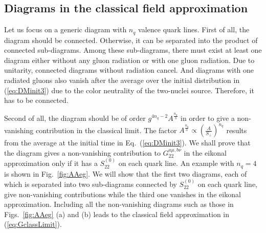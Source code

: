 \documentclass[onecolumn,showpacs,nobibnotes,nofootinbib,12pt,aps,prd,showpacs,notitlepage,nofootinbib,preprintnumbers,amsmath,amssymb]{article}
\def\eq#1{{Eq.~(\ref{#1})}}
\begin{document}

\subsection{Diagrams in the classical field approximation}

Let us focus on a generic diagram with $n_q$ valence quark
lines. First of all, the diagram should be connected. Otherwise, it
can be separated into the product of connected sub-diagrams. Among
these sub-diagrams, there must exist at least one diagram either
without any gluon radiation or with one gluon radiation. Due to
unitarity, connected diagrams without radiation cancel. And diagrams
with one radiated gluons also vanish after the average over the
initial distribution in (\ref{eq:DMinit3}) due to the color neutrality
of the two-nuclei source. Therefore, it has to be connected.

Second of all, the diagram should be of order $g^{4n_q-2}
A^{\frac{n_q}{3}}$ in order to give a non-vanishing contribution in
the classical limit. The factor
$A^{\frac{n_q}{3}}\propto\left(\frac{A}{S_\perp}\right)^{n_q}$ results
from the average at the initial time in \eq{eq:DMinit3}. We shall
prove that the diagram gives a non-vanishing contribution to
$G_{22}^{a\mu,b\nu}$ in the eikonal approximation only if it has a
$S^{(0)}_{22}$ on each quark line. An example with $n_q=4$ is shown in
Fig.~\ref{fig:AAeg}. We will show that the first two diagrams, each of
which is separated into two sub-diagrams connected by $S^{(0)}_{22}$
on each quark line, give non-vanishing contributions while the third
one vanishes in the eikonal approximation. Including all the
non-vanishing diagrams such as those in Figs.~\ref{fig:AAeg} (a) and
(b) leads to the classical field approximation in
(\ref{eq:GclassLimit}).
\end{document}
